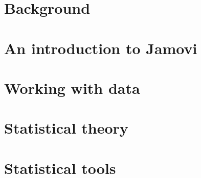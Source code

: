 





\pagestyle{plain}

\maketitle %





\part{Background}




\iffalse %
\part{An introduction to Jamovi}

%


\part{Working with data}







\part{Statistical theory}






\part{Statistical tools}

